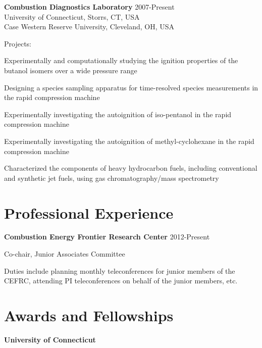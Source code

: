 \textbf{\large Combustion Diagnostics Laboratory} \hfill 2007-Present\\
University of Connecticut, Storrs, CT, USA\\
Case Western Reserve University, Cleveland, OH, USA
\begin{outerlist}
\item[] Projects:
   \begin{innerlist}
   \item Experimentally and computationally studying the ignition properties of the butanol isomers over a wide pressure range
   \item Designing a species sampling apparatus for time-resolved species measurements in the rapid compression machine
   \item Experimentally investigating the autoignition of iso-pentanol in the rapid compression machine
   \item Experimentally investigating the autoignition of methyl-cyclohexane in the rapid compression machine
   \item Characterized the components of heavy hydrocarbon fuels, including conventional and synthetic jet fuels, using gas chromatography/mass spectrometry
   \end{innerlist}

\end{outerlist}

\section{Professional Experience}
   \textbf{Combustion Energy Frontier Research Center} \hfill 2012-Present
   \begin{innerlist}
      \item Co-chair, Junior Associates Committee
      \item Duties include planning monthly teleconferences for junior members of the CEFRC, attending PI teleconferences on behalf of the junior members, etc. 
   \end{innerlist}

\section{Awards and Fellowships}
\textbf{\large University of Connecticut}

